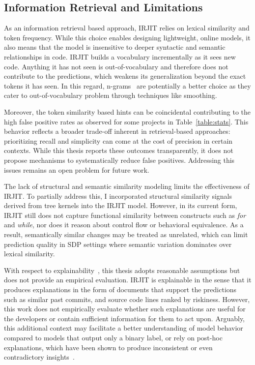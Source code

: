 \documentclass[\main/thesis.tex]{subfiles}
\begin{document}
\subsection{Information Retrieval and Limitations}

As an information retrieval based approach, IRJIT relies on lexical similarity and token frequency. While this choice enables designing lightweight, online models, it also means that the model is insensitive to deeper syntactic and semantic relationships in code. IRJIT builds a vocabulary incrementally as it sees new code. Anything it has not seen is out-of-vocabulary and therefore does not contribute to the predictions, which weakens its generalization beyond the exact tokens it has seen. In this regard, n-grams~\cite{hindle2012,santos2018syntax} are potentially a better choice as they cater to out-of-vocabulary problem through techniques like smoothing. 

Moreover, the token similarity based hints can be coincidental contributing to the high false positive rates as observed for some projects in Table~\ref{table:stats}. This behavior reflects a broader trade-off inherent in retrieval-based approaches: prioritizing recall and simplicity can come at the cost of precision in certain contexts. While this thesis reports these outcomes transparently, it does not propose mechanisms to systematically reduce false positives.
Addressing this issues remains an open problem for future work.

The lack of structural and semantic similarity modeling limits the effectiveness of IRJIT. To partially address this, I incorporated structural similarity signals derived from tree kernels into the IRJIT model.
However, in its current form, IRJIT still does not capture functional similarity between constructs such as \textit{for} and \textit{while}, nor does it reason about control flow or behavioral equivalence. As a result, semantically similar changes may be treated as unrelated, which can limit prediction quality in SDP settings where semantic variation dominates over lexical similarity.


With respect to explainability~\cite{dam2018explainable}, this thesis adopts reasonable assumptions but does not provide an empirical evaluation. IRJIT is explainable in the sense that it produces explanations in the form of documents that support the predictions such as similar past commits, and source code lines ranked by riskiness. However, this work does not empirically evaluate whether such explanations are useful for the developers or contain sufficient information for them to act upon. Arguably, this additional context may facilitate a better understanding of model behavior compared to models that output only a binary label, or rely on post-hoc explanations, which have been shown to produce inconsistent or even contradictory insights~\cite{roy2022don}.
\end{document}
